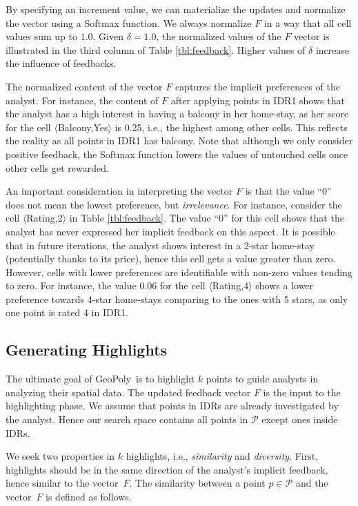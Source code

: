 \documentclass{vldb}
\newcommand{\sgg}{{\sc GeoPoly}}
\begin{document}
\vspace{2pt}
By specifying an increment value, we can materialize the updates and normalize the vector using a Softmax function. We always normalize $F$ in a way that all cell values sum up to $1.0$. Given $\delta = 1.0$, the normalized values of the $F$ vector is illustrated in the third column of Table \ref{tbl:feedback}. Higher values of $\delta$ increase the influence of feedbacks.

\vspace{2pt}
The normalized content of the vector $F$ captures the implicit preferences of the analyst. For instance, the content of $F$ after applying points in IDR1 shows that the analyst has a high interest in having a balcony in her home-stay, as her score for the cell $\langle$Balcony,Yes$\rangle$ is 0.25, i.e., the highest among other cells. This reflects the reality as all points in IDR1 has balcony. Note that although we only consider positive feedback, the Softmax function lowers the values of untouched cells once other cells get rewarded.

\vspace{2pt}
An important consideration in interpreting the vector $F$ is that the value ``0'' does not mean the lowest preference, but {\em irrelevance}. For instance, consider the cell $\langle$Rating,2$\rangle$ in Table \ref{tbl:feedback}. The value ``0'' for this cell shows that the analyst has never expressed her implicit feedback on this aspect. It is possible that in future iterations, the analyst shows interest in a 2-star home-stay (potentially thanks to its price), hence this cell gets a value greater than zero. However, cells with lower preferences are identifiable with non-zero values tending to zero. For instance, the value 0.06 for the cell $\langle$Rating,4$\rangle$ shows a lower preference towards 4-star home-stays comparing to the ones with 5 stars, as only one point is rated 4 in IDR1.

\subsection{Generating Highlights}
The ultimate goal of \sgg\ is to highlight $k$ points to guide analysts in analyzing their spatial data. The updated feedback vector $F$ is the input to the highlighting phase. We assume that points in IDRs are already investigated by the analyst. Hence our search space contains all points in $\mathcal{P}$ except ones inside IDRs.

\vspace{2pt}
We seek two properties in $k$ highlights, i.e., {\em similarity} and {\em diversity}. First, highlights should be in the same direction of the analyst's implicit feedback, hence similar to the vector~$F$. The similarity between a point $p \in \mathcal{P}$ and the vector~$F$ is defined as follows.
\end{document}
